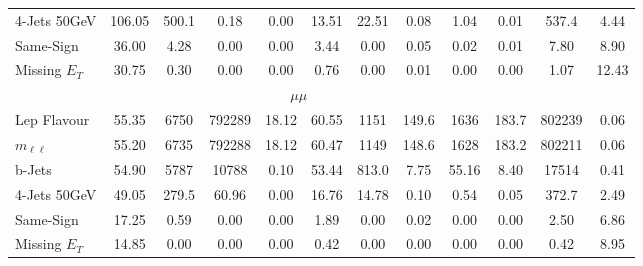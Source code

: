 \begin{table}[htb]
\begin{center}
{\begin{tabular}{l|c||ccc|ccc|cc|c||c}
           4-Jets 50GeV &  	   106.05 &  	   500.1 &  	   0.18 &  	   0.00 &  	   13.51 &  	   22.51 &  	   0.08 &  	   1.04 &  	   0.01 &  	   537.4 & 	 4.44 \\
           Same-Sign    &  	   36.00 &  	   4.28 &  	   0.00 &  	   0.00 &  	   3.44 &  	   0.00 &  	   0.05 &  	   0.02 &  	   0.01 &  	   7.80 & 	 8.90 \\
           Missing $E_{T}$ &  	   30.75 &  	   0.30 &  	   0.00 &  	   0.00 &  	   0.76 &  	   0.00 &  	   0.01 &  	   0.00 &  	   0.00 &  	   1.07 & 	 12.43 \\
           \hline\multicolumn{11}{c}{$\mu\mu$} \\ \hline
           Lep Flavour  &  	   55.35 &  	   6750 &  	   792289 &  	   18.12 &  	   60.55 &  	   1151 &  	   149.6 &  	   1636 &  	   183.7 &  	   802239 & 	 0.06 \\
           $m_{\ell\ell}$ &  	   55.20 &  	   6735 &  	   792288 &  	   18.12 &  	   60.47 &  	   1149 &  	   148.6 &  	   1628 &  	   183.2 &  	   802211 & 	 0.06 \\
           b-Jets       &  	   54.90 &  	   5787 &  	   10788 &  	   0.10 &  	   53.44 &  	   813.0 &  	   7.75 &  	   55.16 &  	   8.40 &  	   17514 & 	 0.41 \\
           4-Jets 50GeV &  	   49.05 &  	   279.5 &  	   60.96 &  	   0.00 &  	   16.76 &  	   14.78 &  	   0.10 &  	   0.54 &  	   0.05 &  	   372.7 & 	 2.49 \\
           Same-Sign    &  	   17.25 &  	   0.59 &  	   0.00 &  	   0.00 &  	   1.89 &  	   0.00 &  	   0.02 &  	   0.00 &  	   0.00 &  	   2.50 & 	 6.86 \\
           Missing $E_{T}$ &  	   14.85 &  	   0.00 &  	   0.00 &  	   0.00 &  	   0.42 &  	   0.00 &  	   0.00 &  	   0.00 &  	   0.00 &  	   0.42 & 	 8.95 \\           
           \hline
        \end{tabular}}
\end{center}
\end{table}
